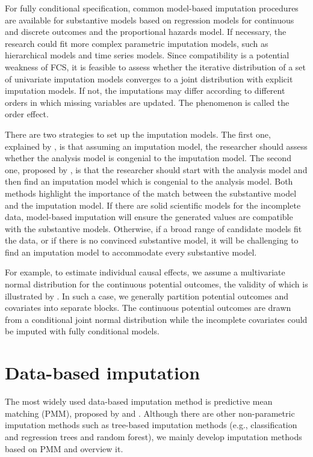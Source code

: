 For fully conditional specification, common model-based imputation procedures are available for substantive models based on regression models for continuous and discrete outcomes and the proportional hazards model. If necessary, the research could fit more complex parametric imputation models, such as hierarchical models and time series models. Since compatibility is a potential weakness of FCS, it is feasible to assess whether the iterative distribution of a set of univariate imputation models converges to a joint distribution with explicit imputation models. If not, the imputations may differ according to different orders in which missing variables are updated. The phenomenon is called the order effect. 

There are two strategies to set up the imputation models. The first one, explained by \citet{meng1994multiple}, is that assuming an imputation model, the researcher should assess whether the analysis model is congenial to the imputation model. The second one, proposed by \citet{bartlett2015multiple}, is that the researcher should start with the analysis model and then find an imputation model which is congenial to the analysis model. Both methods highlight the importance of the match between the substantive model and the imputation model. If there are solid scientific models for the incomplete data, model-based imputation will ensure the generated values are compatible with the substantive models. Otherwise, if a broad range of candidate models fit the data, or if there is no convinced substantive model, it will be challenging to find an imputation model to accommodate every substantive model. 

For example, to estimate individual causal effects, we assume a multivariate normal distribution for the continuous potential outcomes, the validity of which is illustrated by \citet{imbens2015causal}. In such a case, we generally partition potential outcomes and covariates into separate blocks. The continuous potential outcomes are drawn from a conditional joint normal distribution while the incomplete covariates could be imputed with fully conditional models. 

\section{Data-based imputation}
The most widely used data-based imputation method is predictive mean matching (PMM), proposed by \citet{rubin1986statistical} and \citet{little1988missing}. Although there are other non-parametric imputation methods such as tree-based imputation methods (e.g., classification and regression trees and random forest), we mainly develop imputation methods based on PMM and overview it. 

